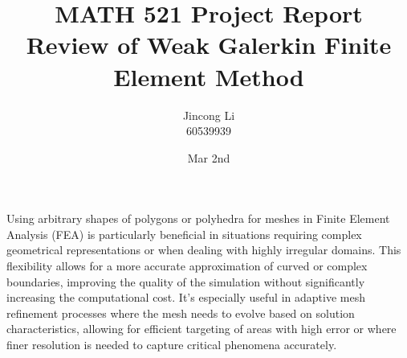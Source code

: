 \documentclass[a4paper,11pt]{article} %
\begin{document}
\setlength{\parskip}{1em} 
\setlength{\parindent}{0pt}
\newcommand{\vect}[1]{\mathbf{#1}}

\title{MATH 521 Project Report \\
Review of Weak Galerkin Finite Element Method}
\author{Jincong Li \\ 60539939}
\date{Mar 2nd}
\maketitle

Using arbitrary shapes of polygons or polyhedra for meshes in Finite Element Analysis (FEA) 
is particularly beneficial in situations requiring complex geometrical representations or 
when dealing with highly irregular domains. This flexibility allows for a more accurate 
approximation of curved or complex boundaries, improving the quality of the simulation 
without significantly increasing the computational cost. It's especially useful in adaptive 
mesh refinement processes where the mesh needs to evolve based on solution characteristics, 
allowing for efficient targeting of areas with high error or where finer resolution is 
needed to capture critical phenomena accurately.
\end{document}
